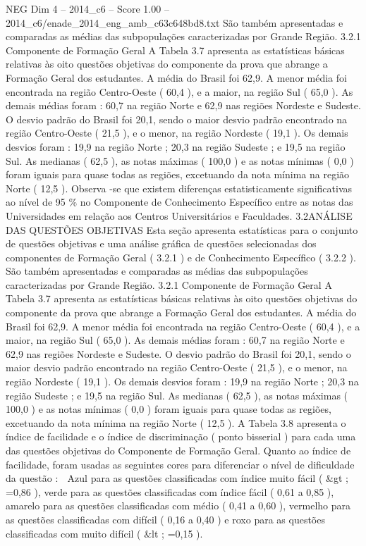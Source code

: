 \begin{textsample}{NEG Dim 4 – 2014\_c6 – Score 1.00 – 2014\_c6/enade\_2014\_eng\_amb\_c63c648bd8.txt}
São também apresentadas e comparadas as médias das subpopulações caracterizadas por Grande Região. 3.2.1 Componente de Formação Geral A Tabela 3.7 apresenta as estatísticas básicas relativas às oito questões objetivas do componente da prova que abrange a Formação Geral dos estudantes.
A média do Brasil foi 62,9.
A menor média foi encontrada na região Centro-Oeste ( 60,4 ), e a maior, na região Sul ( 65,0 ).
As demais médias foram : 60,7 na região Norte e 62,9 nas regiões Nordeste e Sudeste.
O desvio padrão do Brasil foi 20,1, sendo o maior desvio padrão encontrado na região Centro-Oeste ( 21,5 ), e o menor, na região Nordeste ( 19,1 ).
Os demais desvios foram : 19,9 na região Norte ; 20,3 na região Sudeste ; e 19,5 na região Sul.
As medianas ( 62,5 ), as notas máximas ( 100,0 ) e as notas mínimas ( 0,0 ) foram iguais para quase todas as regiões, excetuando da nota mínima na região Norte ( 12,5 ).
Observa -se que existem diferenças estatisticamente significativas ao nível de 95 \% no Componente de Conhecimento Específico entre as notas das Universidades em relação aos Centros Universitários e Faculdades. 3.2ANÁLISE DAS QUESTÕES OBJETIVAS Esta seção apresenta estatísticas para o conjunto de questões objetivas e uma análise gráfica de questões selecionadas dos componentes de Formação Geral ( 3.2.1 ) e de Conhecimento Específico ( 3.2.2 ).
São também apresentadas e comparadas as médias das subpopulações caracterizadas por Grande Região. 3.2.1 Componente de Formação Geral A Tabela 3.7 apresenta as estatísticas básicas relativas às oito questões objetivas do componente da prova que abrange a Formação Geral dos estudantes.
A média do Brasil foi 62,9.
A menor média foi encontrada na região Centro-Oeste ( 60,4 ), e a maior, na região Sul ( 65,0 ).
As demais médias foram : 60,7 na região Norte e 62,9 nas regiões Nordeste e Sudeste.
O desvio padrão do Brasil foi 20,1, sendo o maior desvio padrão encontrado na região Centro-Oeste ( 21,5 ), e o menor, na região Nordeste ( 19,1 ).
Os demais desvios foram : 19,9 na região Norte ; 20,3 na região Sudeste ; e 19,5 na região Sul.
As medianas ( 62,5 ), as notas máximas ( 100,0 ) e as notas mínimas ( 0,0 ) foram iguais para quase todas as regiões, excetuando da nota mínima na região Norte ( 12,5 ).
A Tabela 3.8 apresenta o índice de facilidade e o índice de discriminação ( ponto bisserial ) para cada uma das questões objetivas do Componente de Formação Geral.
Quanto ao índice de facilidade, foram usadas as seguintes cores para diferenciar o nível de dificuldade da questão :  Azul para as questões classificadas com índice muito fácil ( \&gt ; =0,86 ), verde para as questões classificadas com índice fácil ( 0,61 a 0,85 ), amarelo para as questões classificadas com médio ( 0,41 a 0,60 ), vermelho para as questões classificadas com difícil ( 0,16 a 0,40 ) e roxo para as questões classificadas com muito difícil ( \&lt ; =0,15 ).

\end{textsample}
